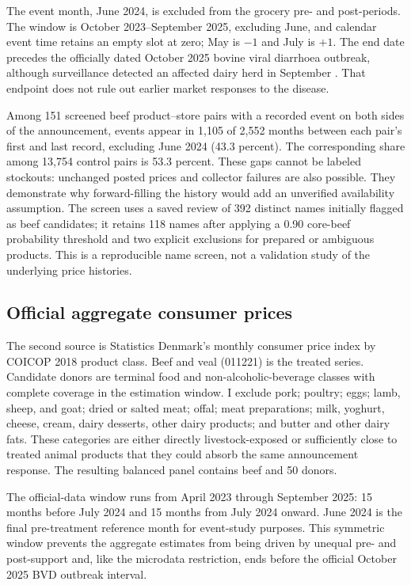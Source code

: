 \documentclass[11pt]{article}
\begin{document}
The event month, June 2024, is excluded from the grocery pre- and post-periods. The window is October 2023--September 2025, excluding June, and calendar event time retains an empty slot at zero; May is $-1$ and July is $+1$. The end date precedes the officially dated October 2025 bovine viral diarrhoea outbreak, although surveillance detected an affected dairy herd in September \citep{dvfaBVD,dvt2025}. That endpoint does not rule out earlier market responses to the disease.

Among 151 screened beef product--store pairs with a recorded event on both sides of the announcement, events appear in 1,105 of 2,552 months between each pair's first and last record, excluding June 2024 (43.3 percent). The corresponding share among 13,754 control pairs is 53.3 percent. These gaps cannot be labeled stockouts: unchanged posted prices and collector failures are also possible. They demonstrate why forward-filling the history would add an unverified availability assumption. The screen uses a saved review of 392 distinct names initially flagged as beef candidates; it retains 118 names after applying a 0.90 core-beef probability threshold and two explicit exclusions for prepared or ambiguous products. This is a reproducible name screen, not a validation study of the underlying price histories.

\subsection{Official aggregate consumer prices}
The second source is Statistics Denmark's monthly consumer price index by COICOP 2018 product class. Beef and veal (011221) is the treated series. Candidate donors are terminal food and non-alcoholic-beverage classes with complete coverage in the estimation window. I exclude pork; poultry; eggs; lamb, sheep, and goat; dried or salted meat; offal; meat preparations; milk, yoghurt, cheese, cream, dairy desserts, other dairy products; and butter and other dairy fats. These categories are either directly livestock-exposed or sufficiently close to treated animal products that they could absorb the same announcement response. The resulting balanced panel contains beef and 50 donors.

The official-data window runs from April 2023 through September 2025: 15 months before July 2024 and 15 months from July 2024 onward. June 2024 is the final pre-treatment reference month for event-study purposes. This symmetric window prevents the aggregate estimates from being driven by unequal pre- and post-support and, like the microdata restriction, ends before the official October 2025 BVD outbreak interval.
\end{document}
